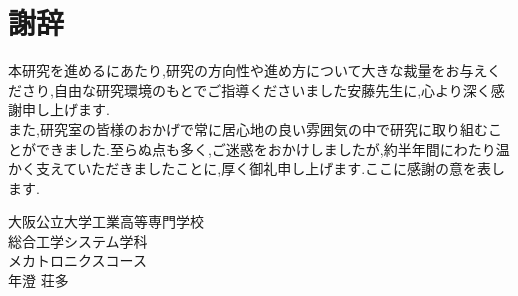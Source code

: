 \chapter*{謝辞}
\thispagestyle{plain}

本研究を進めるにあたり,研究の方向性や進め方について大きな裁量をお与えくださり,自由な研究環境のもとでご指導くださいました安藤先生に,心より深く感謝申し上げます. \\
また,研究室の皆様のおかげで常に居心地の良い雰囲気の中で研究に取り組むことができました.至らぬ点も多く,ご迷惑をおかけしましたが,約半年間にわたり温かく支えていただきましたことに,厚く御礼申し上げます.ここに感謝の意を表します.

\begin{flushright}
大阪公立大学工業高等専門学校\\
総合工学システム学科\\
メカトロニクスコース\\
年澄 荘多
\end{flushright}
